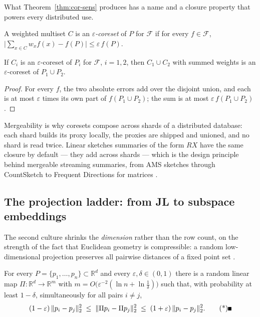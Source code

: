 What Theorem~\ref{thm:cor-sens} produces has a name and a closure
property that powers every distributed use.

\begin{definition}\label{def:cor-coreset}
A weighted multiset $C$ is an \emph{$\varepsilon$-coreset} of $P$ for
$\mathcal{F}$ if for every $f \in \mathcal{F}$,
$\bigl|\sum_{x \in C} w_x f(x) - f(P)\bigr| \le \varepsilon\, f(P)$.
\end{definition}

\begin{lemma}[Mergeability]\label{lem:cor-merge}
If $C_i$ is an $\varepsilon$-coreset of $P_i$ for $\mathcal{F}$,
$i = 1,2$, then $C_1 \cup C_2$ with summed weights is an
$\varepsilon$-coreset of $P_1 \cup P_2$. \eop
\end{lemma}

\begin{proof}
For every $f$, the two absolute errors add over the disjoint union, and
each is at most $\varepsilon$ times its own part of $f(P_1 \cup P_2)$;
the sum is at most $\varepsilon\, f(P_1 \cup P_2)$.
\end{proof}

Mergeability is why coresets compose across shards of a distributed
database: each shard builds its proxy locally, the proxies are shipped
and unioned, and no shard is read twice. Linear sketches summaries of
the form $RX$ have the same closure by default --- they add across
shards --- which is the design principle behind mergeable streaming
summaries, from AMS sketches \citep{coresets-rnla-bg13} through
CountSketch \citep{coresets-rnla-bg3} to Frequent Directions for
matrices \citep{coresets-rnla-bg12}.

\subsection{The projection ladder: from JL to subspace embeddings}
\label{sec:cor-projection-ladder}

The second culture shrinks the \emph{dimension} rather than the row
count, on the strength of the fact that Euclidean geometry is
compressible: a random low-dimensional projection preserves all pairwise
distances of a fixed point set \citep{coresets-rnla-bg1}.

\begin{theorem}\label{thm:cor-jl}
For every $P = \{p_1,\dots,p_n\} \subset \mathbb{R}^d$ and every
$\varepsilon, \delta \in (0,1)$ there is a random linear map
$\Pi\colon \mathbb{R}^d \to \mathbb{R}^{m}$ with
$m = O\bigl(\varepsilon^{-2}(\ln n + \ln\tfrac1\delta)\bigr)$ such
that, with probability at least $1-\delta$, simultaneously for all
pairs $i \ne j$,
\[
(1-\varepsilon)\,\|p_i - p_j\|_2^2 \;\le\;
\|\Pi p_i - \Pi p_j\|_2^2 \;\le\;
(1+\varepsilon)\,\|p_i - p_j\|_2^2. \eopm
\]
\end{theorem}


